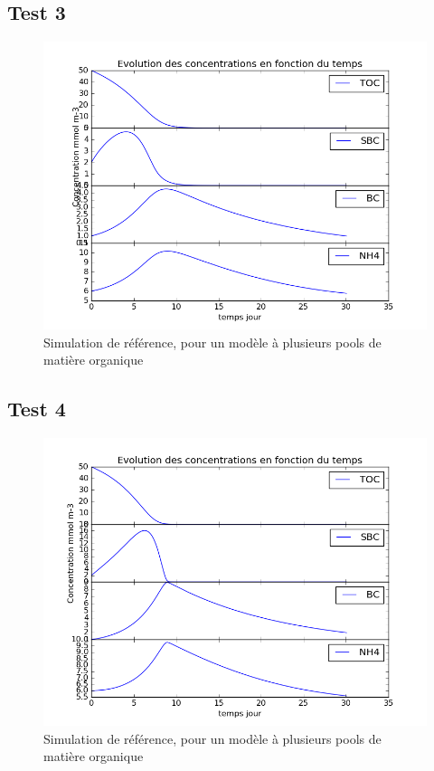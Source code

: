 \subsection{Test 3}

\begin{figure}[h!]
  \includegraphics[width=\textwidth]{partie1/Test3.png}
  \caption{Simulation de r\'ef\'erence, pour un mod\`ele \`a plusieurs pools de mati\`ere organique
  }
  \label{fig:partie1test3}
\end{figure}

\subsection{Test 4}

\begin{figure}[h!]
  \includegraphics[width=\textwidth]{partie1/Test4.png}
  \caption{Simulation de r\'ef\'erence, pour un mod\`ele \`a plusieurs pools de mati\`ere organique
  }
  \label{fig:partie1test4}
\end{figure}


